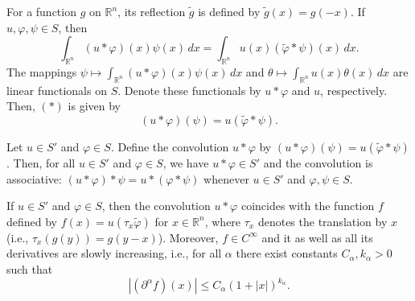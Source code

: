 For a function $g$ on $\mathbb{R}^n$, its reflection $\tilde{g}$ is defined by $\tilde{g}(x) = g(-x)$. If $u, \varphi, \psi \in S$, then
$$
\int_{\mathbb{R}^n} (u * \varphi)(x) \psi(x) \, dx = \int_{\mathbb{R}^n} u(x) (\tilde{\varphi} * \psi)(x) \, dx.
$$
The mappings $\psi \longmapsto \int_{\mathbb{R}^n} (u * \varphi)(x) \psi(x) \, dx$ and $\theta \longmapsto \int_{\mathbb{R}^n} u(x) \theta(x) \, dx$ are linear functionals on $S$. Denote these functionals by $u * \varphi$ and $u$, respectively. Then, $(*)$ is given by
$$
(u * \varphi)(\psi) = u(\tilde{\varphi} * \psi).
$$
\begin{definition}
    Let $u \in S'$ and $\varphi \in S$. Define the convolution $u * \varphi$ by $(u * \varphi)(\psi) = u(\tilde{\varphi} * \psi)$. Then, for all $u \in S'$ and $\varphi \in S$, we have $u * \varphi \in S'$ and the convolution is associative: $(u * \varphi) * \psi = u * (\varphi * \psi)$ whenever $u \in S'$ and $\varphi, \psi \in S$.
\end{definition}
\begin{theorem}
    If $u \in S'$ and $\varphi \in S$, then the convolution $u * \varphi$ coincides with the function $f$ defined by $f(x) = u(\tau_x \tilde{\varphi})$ for $x \in \mathbb{R}^n$, where $\tau_x$ denotes the translation by $x$ (i.e., $\tau_x(g(y)) = g(y-x)$). Moreover, $f \in C^\infty$ and it as well as all its derivatives are slowly increasing, i.e., for all $\alpha$ there exist constants $C_\alpha, k_\alpha > 0$ such that
$$
\left| (\partial^\alpha f)(x) \right| \leqslant C_\alpha (1 + |x|)^{k_\alpha}.
$$
\end{theorem}
